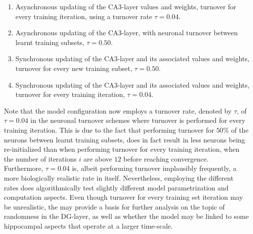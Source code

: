 \begin{enumerate}  
\item Asynchronous updating of the CA3-layer values and weights, turnover for every training iteration, using a turnover rate $\tau=0.04$.
\item Asynchronous updating of the CA3-layer, with neuronal turnover between learnt training subsets, $\tau=0.50$.
\item Synchronous updating of the CA3-layer and its associated values and weights, turnover for every new training subset, $\tau=0.50$.
\item Synchronous updating of the CA3-layer and its associated values and weights, turnover for every training iteration, $\tau=0.04$.
\end{enumerate}

Note that the model configuration now employs a turnover rate, denoted by $\tau$, of $\tau=0.04$ in the neuronal turnover schemes where turnover is performed for every training iteration. This is due to the fact that performing turnover for  $50 \%$ of the neurons between learnt training subsets, does in fact result in less neurons being re-initialized than when performing turnover for every training iteration, when the number of iterations $i$ are above $12$ before reaching convergence. Furthermore, $\tau=0.04$ is, albeit performing turnover implausibly frequently, a more biologically realistic rate in itself. 
Nevertheless, employing the different rates does algorithmically test slightly different model parametrization and computation aspects. Even though turnover for every training set iteration may be unrealistic, the may provide a basis for further analysis on the topic of randomness in the DG-layer, as well as whether the model may be linked to some hippocampal aspects that operate at a larger time-scale.


